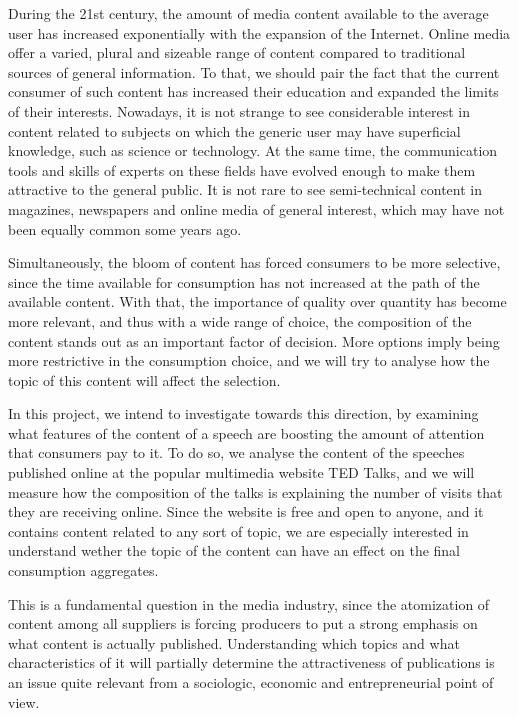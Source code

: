 \documentclass[a4paper, 11pt]{article} %
\begin{document}
During the 21st century, the amount of media content available to the average user has increased exponentially with the expansion of the Internet. Online media offer a varied, plural and sizeable range of content compared to traditional sources of general information. To that, we should pair the fact that the current consumer of such content has increased their education and expanded the limits of their interests. Nowadays, it is not strange to see considerable interest in content related to subjects on which the generic user may have superficial knowledge, such as science or technology. At the same time, the communication tools and skills of experts on these fields have evolved enough to make them attractive to the general public. It is not rare to see semi-technical content in magazines, newspapers and online media of general interest, which may have not been equally common some years ago.

Simultaneously, the bloom of content has forced consumers to be more selective, since the time available for consumption has not increased at the path of the available content. With that, the importance of quality over quantity has become more relevant, and thus with a wide range of choice, the composition of the content stands out as an important factor of decision. More options imply being more restrictive in the consumption choice, and we will try to analyse how the topic of this content will affect the selection.

In this project, we intend to investigate towards this direction, by examining what features of the content of a speech are boosting the amount of attention that consumers pay to it. To do so, we analyse the content of the speeches published online at the popular multimedia website TED Talks, and we will measure how the composition of the talks is explaining the number of visits that they are receiving online. Since the website is free and open to anyone, and it contains content related to any sort of topic, we are especially interested in understand wether the topic of the content can have an effect on the final consumption aggregates.

This is a fundamental question in the media industry, since the atomization of content among all suppliers is forcing producers to put a strong emphasis on what content is actually published. Understanding which topics and what characteristics of it will partially determine the attractiveness of publications is an issue quite relevant from a sociologic, economic and entrepreneurial point of view.
\end{document}
